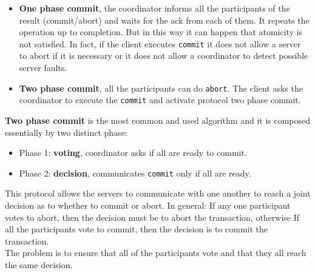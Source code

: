 \begin{itemize}
	\item \textbf{One phase commit}, the coordinator informs all the participants of the result (commit/abort) and waits for the ack from each of them. It repeats the operation up to completion. But in this way it can happen that atomicity is not satisfied. In fact, if the client executes \verb|commit| it does not allow a server to abort if it is necessary or it does not allow a coordinator to detect possible server faults.
	\item \textbf{Two phase commit}, all the participants can do \verb|abort|. The client asks the coordinator to execute the \verb|commit| and activate protocol two phase commit.
\end{itemize}

\textbf{Two phase commit} is the most common and used algorithm and it is composed essentially by two distinct phase:
\begin{itemize}
	\item Phase 1: \textbf{voting}, coordinator asks if all are ready to commit.
	\item Phase 2: \textbf{decision}, communicates \verb|commit| only if all are ready.
\end{itemize}
This protocol allows the servers to communicate with one another to reach a joint decision as to whether to commit or abort. In general: If any one participant votes to abort, then the decision must be to abort the transaction, otherwise If all the participants vote to commit, then the decision is to commit the transaction.\\
The problem is to ensure that all of the participants vote and that they all reach the
same decision.
\newpage
